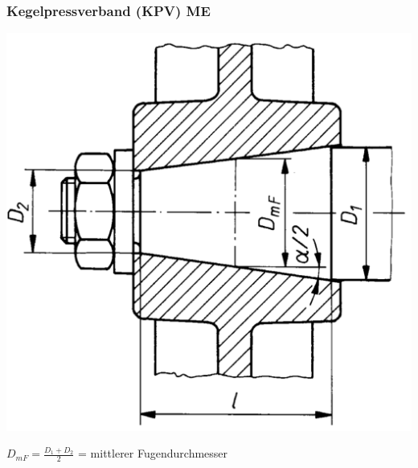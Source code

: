 \subsubsection{Kegelpressverband (KPV) \hfill ME}
\begin{footnotesize}
    \begin{minipage}{0.3\linewidth}
        \begin{center}
            \includegraphics[width = 1.0\linewidth]{src/images/MAEIP_Kegelpressverband}
        \end{center}
    \end{minipage}
    \begin{minipage}{0.58\linewidth}
        \begin{center}
            \scriptsize{$D_{mF} = \frac{D_1 + D_2}{2}$ = mittlerer Fugendurchmesser} 
            \vspace{-1mm}
        \end{center}
    \end{minipage}
\end{footnotesize}
\vspace{0.1em}

